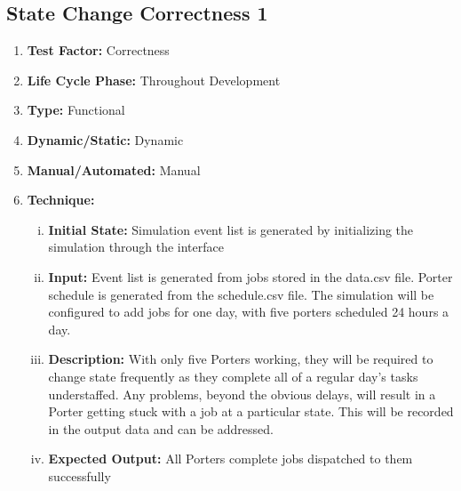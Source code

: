 \documentclass[paper=letter, fontsize=10pt]{scrartcl}
\numberwithin{equation}{section}		%
\numberwithin{figure}{section}			%
\numberwithin{table}{section}				%
\begin{document}
\subsection{State Change Correctness 1}
\begin{enumerate}[]
	\item \textbf{Test Factor:} Correctness
	\item \textbf{Life Cycle Phase:} Throughout Development
	\item \textbf{Type:} Functional
	\item \textbf{Dynamic/Static:} Dynamic
	\item \textbf{Manual/Automated:} Manual
	\item \textbf{Technique:}
		\begin{enumerate}[(i)]
			\item \textbf{Initial State:} Simulation event list is generated by initializing the simulation through the interface
			\item \textbf{Input:} Event list is generated from jobs stored in the data.csv file. Porter schedule is generated from the schedule.csv file. The simulation will be configured to add jobs for one day, with five porters scheduled 24 hours a day.
			\item \textbf{Description:} With only five Porters working, they will be required to change state frequently as they complete all of a regular day's tasks understaffed. Any problems, beyond the obvious delays, will result in a Porter getting stuck with a job at a particular state. This will be recorded in the output data and can be addressed.
			\item \textbf{Expected Output:} All Porters complete jobs dispatched to them successfully 
		\end{enumerate}
\end{enumerate}
\end{document}
